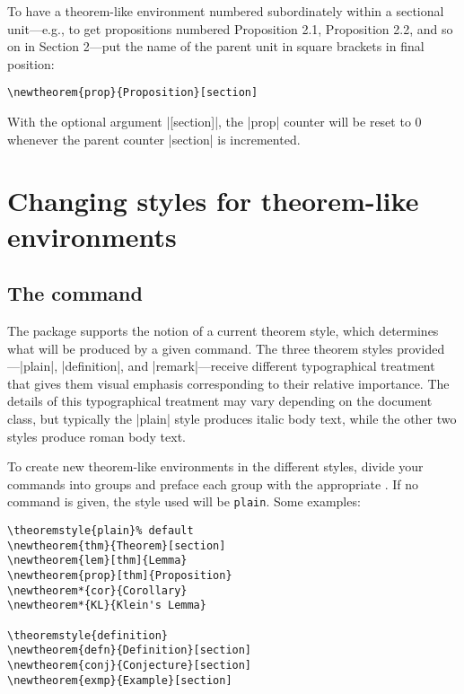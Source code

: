 \documentclass[leqno,titlepage,openany]{amsldoc}
\begin{document}
To have a theorem-like environment numbered subordinately within a
sectional unit---e.g., to get propositions numbered Proposition 2.1,
Proposition 2.2, and so on in Section 2---put the name of the parent
unit in square brackets in final position:
\begin{verbatim}
\newtheorem{prop}{Proposition}[section]
\end{verbatim}
With the optional argument |[section]|, the |prop| counter will be reset
to 0 whenever the parent counter |section| is incremented.

\section{Changing styles for theorem-like environments}

\subsection{The  command}

The  package supports the notion of a current theorem style,
which determines what will be produced by a given 
command. The three theorem styles provided---|plain|,\relax {}\relax {} |definition|, and |remark|---receive
different typographical treatment that gives them visual emphasis
corresponding to their relative importance. The details of this
typographical treatment may vary depending on the document class, but
typically the |plain| style produces italic body text, while the other
two styles produce roman body text.

To create new theorem-like environments in the different styles,
divide your  commands into groups and preface each
group with the appropriate . If no 
command is given, the style used will be \texttt{plain}. Some examples:
\begin{verbatim}
\theoremstyle{plain}% default
\newtheorem{thm}{Theorem}[section]
\newtheorem{lem}[thm]{Lemma}
\newtheorem{prop}[thm]{Proposition}
\newtheorem*{cor}{Corollary}
\newtheorem*{KL}{Klein's Lemma}

\theoremstyle{definition}
\newtheorem{defn}{Definition}[section]
\newtheorem{conj}{Conjecture}[section]
\newtheorem{exmp}{Example}[section]
\end{verbatim}
\pagebreak
\end{document}
